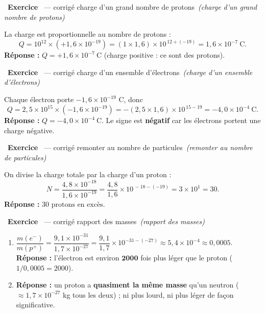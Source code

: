 \documentclass[11pt,a4paper]{article}
\newcommand{\pp}{p^{+}}
\newcommand{\ee}{e^{-}}
\newcommand{\rep}{\textbf{\color{excol}Réponse : }}
\newcounter{exo}
\newcommand{\cor}[1][]{\stepcounter{exo}\par\medskip%
  \noindent{\color{primary}\rule[-2pt]{3.5pt}{15pt}}\ \textbf{\color{primarydark}\large Exercice \theexo}%
  \ \textmd{\normalsize\color{black!55}— corrigé}%
  \ifx\relax#1\relax\relax\else\ \textmd{\normalsize\color{black!65}\itshape (#1)}\fi\par\nopagebreak\smallskip}
\begin{document}

\cor[charge d'un grand nombre de protons]
La charge est proportionnelle au nombre de protons :
\[ Q = 10^{12}\times(+1{,}6\times10^{-19}) = (1\times1{,}6)\times10^{\,12+(-19)} = 1{,}6\times10^{-7}\ \text{C}. \]
\rep $\boxed{Q = +1{,}6\times10^{-7}\ \text{C}}$ (charge positive : ce sont des protons).

\cor[charge d'un ensemble d'électrons]
Chaque électron porte $-1{,}6\times10^{-19}$ C, donc
\[ Q = 2{,}5\times10^{15}\times(-1{,}6\times10^{-19}) = -(2{,}5\times1{,}6)\times10^{\,15-19}
      = -4{,}0\times10^{-4}\ \text{C}. \]
\rep $\boxed{Q = -4{,}0\times10^{-4}\ \text{C}}$. Le signe est \textbf{négatif} car les électrons portent
une charge négative.

\cor[remonter au nombre de particules]
On divise la charge totale par la charge d'un proton :
\[ N = \frac{4{,}8\times10^{-18}}{1{,}6\times10^{-19}}
     = \frac{4{,}8}{1{,}6}\times10^{\,-18-(-19)} = 3\times10^{1} = 30. \]
\rep $\boxed{30 \text{ protons en excès}}$.

\cor[rapport des masses]
\begin{enumerate}[label=\alph*)]
  \item $\dfrac{m(\ee)}{m(\pp)} = \dfrac{9{,}1\times10^{-31}}{1{,}7\times10^{-27}}
        = \dfrac{9{,}1}{1{,}7}\times10^{-31-(-27)} \approx 5{,}4\times10^{-4} \approx 0{,}0005$.
        \; \rep l'électron est environ $\mathbf{2000}$ fois plus léger que le proton
        ($1/0{,}0005 = 2000$).
  \item \rep un proton a \textbf{quasiment la même masse} qu'un neutron
        ($\approx 1{,}7\times10^{-27}$ kg tous les deux) ; ni plus lourd, ni plus léger de façon
        significative.
\end{enumerate}
\end{document}
